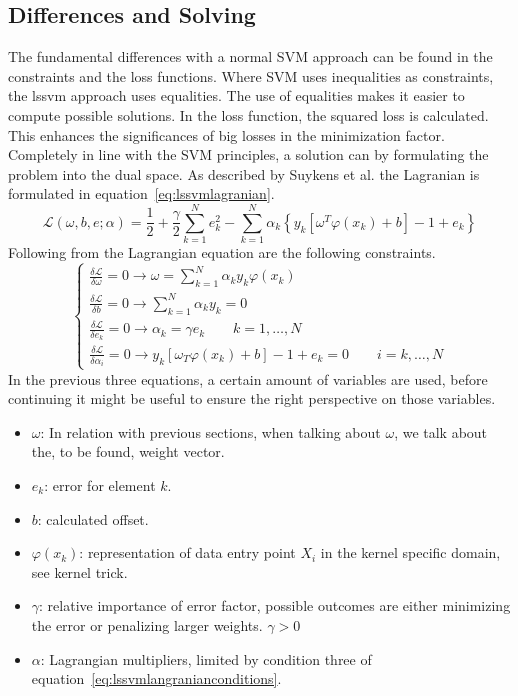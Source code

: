 \subsection{Differences and Solving}
The fundamental differences with a normal SVM approach can be found in the constraints and the loss functions.
Where SVM uses inequalities as constraints, the lssvm approach uses equalities. 
The use of equalities makes it easier to compute possible solutions.
In the loss function, the squared loss is calculated. 
This enhances the significances of big losses in the minimization factor.
Completely in line with the SVM principles, a solution can by formulating the problem into the dual space.\cite{Suykens2002}
As described by Suykens et al. the Lagranian is formulated in equation~\ref{eq:lssvmlagranian}.
\begin{equation}
	\mathscr{L}(\omega,b,e;\alpha)=\frac{1}{2}+ \frac{\gamma}{2} \sum_{k=1}^{N}e^2_k - \sum_{k=1}^{N}\alpha_k\left\{ y_k\left[\omega^T\varphi(x_k) + b\right] - 1 + e_k \right\}
	\label{eq:lssvmlagranian}
\end{equation}
Following from the Lagrangian equation are the following constraints.
\begin{equation}
	\begin{cases}
		\frac{\delta \mathscr{L}}{\delta \omega} = 0 \to \omega = \sum_{k=1}^{N}\alpha_k y_k\varphi(x_k) \\
		\frac{\delta \mathscr{L}}{\delta b} = 0 \to \sum_{k=1}^{N}\alpha_k y_k = 0 \\
		\frac{\delta \mathscr{L}}{\delta e_k} = 0 \to \alpha_k=\gamma e_k \qquad k = 1,\dots,N\\
		\frac{\delta \mathscr{L}}{\delta \alpha_i} = 0 \to  y_k\left[\omega_T\varphi(x_k) + b \right] - 1 + e_k = 0 \qquad i = k,\dots,N
	\end{cases}
	\label{eq:lssvmlangranianconditions}
\end{equation}
In the previous three equations, a certain amount of variables are used, before continuing it might be useful to ensure the right perspective on those variables.
\begin{itemize}
	\item $\omega$: In relation with previous sections, when talking about $\omega$, we talk about the, to be found, weight vector.
	\item $e_k$: error for element $k$.
	\item $b$: calculated offset.
	\item $\varphi(x_k)$: representation of data entry point $X_i$ in the kernel specific domain, see kernel trick.
	\item $\gamma$: relative importance of error factor, possible outcomes are either minimizing the error or penalizing larger weights. $\gamma > 0$
	\item $\alpha$: Lagrangian multipliers, limited by condition three of equation~\ref{eq:lssvmlangranianconditions}.
\end{itemize}
